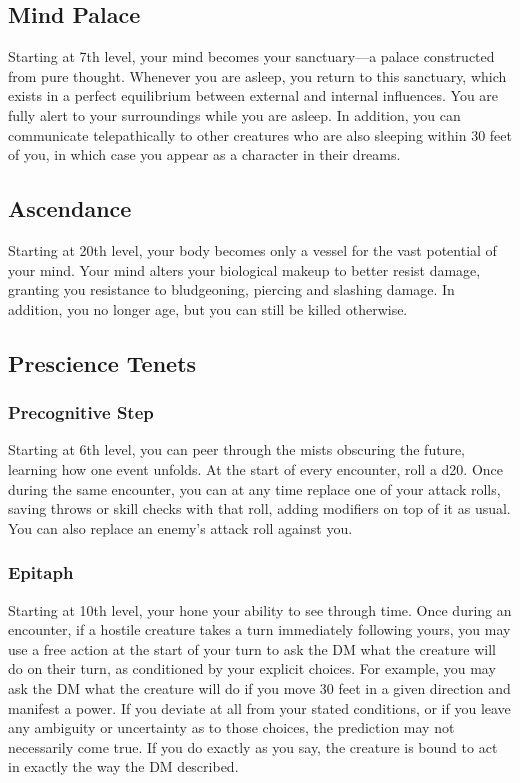 \subsection{Mind Palace}
Starting at 7th level,
your mind becomes your sanctuary---a palace constructed
from pure thought.
Whenever you are asleep,
you return to this sanctuary,
which exists in a perfect equilibrium between
external and internal influences.
You are fully alert to your surroundings
while you are asleep.
In addition, you can communicate telepathically to other
creatures who are also sleeping within 30 feet of you,
in which case you appear as a character in their dreams.

\subsection{Ascendance}
Starting at 20th level,
your body becomes only a vessel for the vast potential
of your mind.
Your mind alters your biological makeup to better resist damage,
granting you resistance to bludgeoning, piercing and slashing damage.
In addition,
you no longer age,
but you can still be killed otherwise.

\subsection{Prescience Tenets}

\subsubsection{Precognitive Step}
Starting at 6th level,
you can peer through the mists obscuring the future,
learning how one event unfolds.
At the start of every encounter, roll a d20.
Once during the same encounter,
you can at any time replace one of your attack rolls,
saving throws or skill checks with that roll,
adding modifiers on top of it as usual.
You can also replace an enemy's attack roll against you.

\subsubsection{Epitaph}
Starting at 10th level,
your hone your ability to see through time.
Once during an encounter,
if a hostile creature takes a turn immediately following yours,
you may use a free action at the start of your turn
to ask the DM what the creature will do on their turn,
as conditioned by your explicit choices.
For example,
you may ask the DM what the creature will do
if you move 30 feet in a given direction and manifest a power.
If you deviate at all from your stated conditions,
or if you leave any ambiguity or uncertainty as to those choices,
the prediction may not necessarily come true.
If you do exactly as you say,
the creature is bound to act in exactly the way the DM described.


